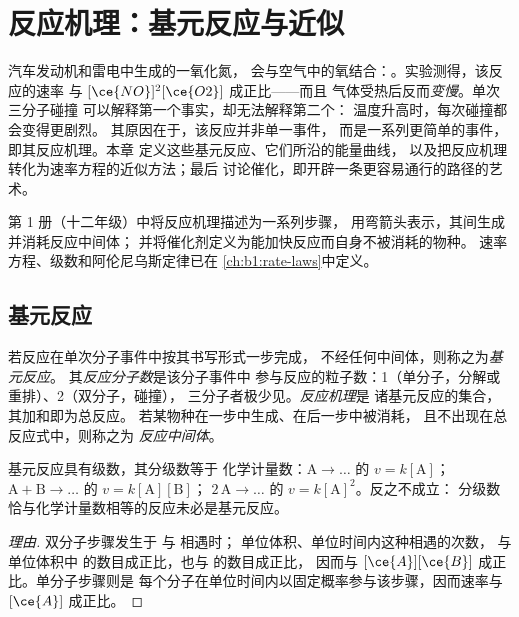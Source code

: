\chapter{反应机理：基元反应与近似}\label{ch:b1:elementary-steps}

汽车发动机和雷电中生成的一氧化氮，
会与空气中的氧结合：。实验测得，该反应的速率
与 $[\ce{NO}]^2[\ce{O2}]$ 成正比——而且
气体受热后反而\emph{变慢}。单次三分子碰撞
可以解释第一个事实，却无法解释第二个：
温度升高时，每次碰撞都会变得更剧烈。
其原因在于，该反应并非单一事件，
而是一系列更简单的事件，即其反应机理。本章
定义这些基元反应、它们所沿的能量曲线，
以及把反应机理转化为速率方程的近似方法；最后
讨论催化，即开辟一条更容易通行的路径的艺术。

\begin{recall}
第 1 册（十二年级）中将反应机理描述为一系列步骤，
用弯箭头表示，其间生成并消耗反应中间体；
并将催化剂定义为能加快反应而自身不被消耗的物种。
速率方程、级数和阿伦尼乌斯定律已在
\cref{ch:b1:rate-laws}中定义。
\end{recall}

\section{基元反应}

\begin{definition}\label{def:b1:elementary-steps:elementary-step}
若反应在单次分子事件中按其书写形式一步完成，
不经任何中间体，则称之为\emph{基元反应}。
其\emph{反应分子数}是该分子事件中
参与反应的粒子数：1（单分子，分解或重排）、2（双分子，碰撞），
三分子者极少见。\emph{反应机理}是
诸基元反应的集合，其加和即为总反应。
若某物种在一步中生成、在后一步中被消耗，
且不出现在总反应式中，则称之为
\emph{反应中间体}。
\end{definition}

\begin{proposition}[基元反应的速率方程]\label{prop:b1:elementary-steps:elementary-law}
基元反应具有级数，其分级数等于
化学计量数：$\mathrm{A} \to \dots$ 的 $v = k[\mathrm{A}]$；
$\mathrm{A} + \mathrm{B} \to \dots$ 的 $v = k[\mathrm{A}][\mathrm{B}]$；
$2\,\mathrm{A} \to \dots$ 的 $v = k[\mathrm{A}]^2$。反之不成立：
分级数恰与化学计量数相等的反应未必是基元反应。
\end{proposition}

\begin{proof}[理由]
双分子步骤发生于  与  相遇时；
单位体积、单位时间内这种相遇的次数，
与单位体积中  的数目成正比，也与  的数目成正比，
因而与 $[\ce{A}][\ce{B}]$ 成正比。单分子步骤则是
每个分子在单位时间内以固定概率参与该步骤，因而速率与 $[\ce{A}]$ 成正比。
\end{proof}

